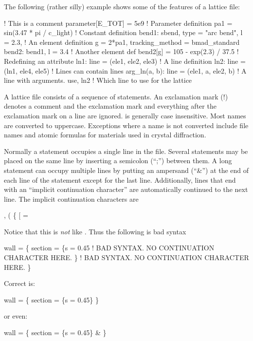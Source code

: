 The following (rather silly) example shows some of the features of a
\bmad lattice file:
\begin{example}
  ! This is a comment
  parameter[E_TOT] = 5e9                   ! Parameter definition
  pa1 = sin(3.47 * pi / c_light)                 ! Constant definition
  bend1: sbend, type = "arc bend", l = 2.3,      ! An element definition
      g = 2*pa1, tracking_method = bmad_standard
  bend2: bend1, l = 3.4                          ! Another element def
  bend2[g] = 105 - exp(2.3) / 37.5               ! Redefining an attribute
  ln1: line = (ele1, ele2, ele3)                 ! A line definition
  ln2: line = (ln1, ele4, ele5)                  ! Lines can contain lines
  arg_ln(a, b): line = (ele1, a, ele2, b)        ! A line with arguments.
  use, ln2                                       ! Which line to use for the lattice
\end{example}

A \bmad lattice file consists of a sequence of statements. An exclamation mark (!) denotes a comment
and the exclamation mark and everything after the exclamation mark on a line are ignored.  \bmad is
generally case insensitive. Most names are converted to uppercase. Exceptions where a name is not
converted include file names and atomic formulas for materials used in crystal diffraction.

Normally a statement occupies a single line in the file. Several statements may be placed on the
same line by inserting a semicolon (``;'') between them. A long statement can occupy multiple lines
by putting an ampersand (``\&'') at the end of each line of the statement except for the last
line. Additionally, lines that end with an ``implicit continuation character'' are automatically
continued to the next line. The implicit continuation characters are
\begin{example}
  ,   (   \{   [   =
\end{example}
Notice
that this is {\em not} like . Thus the following is bad syntax
\begin{example}
  wall = \{
    section = \{s = 0.45     ! BAD SYNTAX. NO CONTINUATION CHARACTER HERE.
    \}                       ! BAD SYNTAX. NO CONTINUATION CHARACTER HERE.
  \}
\end{example}
Correct is:
\begin{example}
  wall = \{
    section = \{s = 0.45\} \}
\end{example}
or even:
\begin{example}
  wall = \{
    section = \{s = 0.45\} \&
  \}
\end{example}

